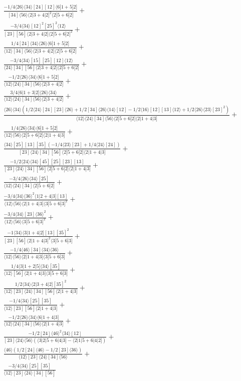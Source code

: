 \documentclass[varwidth, border=5pt]{standalone}
\begin{document}
\begin{my}
$\begin{gathered}
\scriptscriptstyle\frac{-1/4⟨26⟩⟨34⟩[24][12]⟨6|1+5|2]}{[34]⟨56⟩⟨2|3+4|2]^2⟨2|5+6|2]}+\\
\scriptscriptstyle\frac{-3/4⟨34⟩[12]^2[25]^2⟨12⟩}{[23][56]⟨2|3+4|2]⟨2|5+6|2]^2}+\\
\scriptscriptstyle\frac{1/4[24]⟨34⟩⟨26⟩⟨6|1+5|2]}{⟨12⟩[34]⟨56⟩⟨2|3+4|2]⟨2|5+6|2]}+\\
\scriptscriptstyle\frac{-3/4⟨34⟩[15][25][12]⟨12⟩}{⟨24⟩[34][56]⟨2|3+4|2]⟨2|5+6|2]}+\\
\scriptscriptstyle\frac{-1/2⟨26⟩⟨34⟩⟨6|1+5|2]}{⟨12⟩⟨24⟩[34]⟨56⟩⟨2|3+4|2]}+\\
\scriptscriptstyle\frac{3/4⟨6|1+3|2]⟨26⟩⟨34⟩}{⟨12⟩⟨24⟩[34]⟨56⟩⟨2|3+4|2]}+\\
\scriptscriptstyle\frac{⟨26⟩⟨34⟩(1/2⟨24⟩[24][23]⟨26⟩+1/2[34]⟨26⟩⟨14⟩[12]-1/2⟨16⟩[12][13]⟨12⟩+1/2⟨26⟩⟨23⟩[23]^2)}{⟨12⟩⟨24⟩[34]⟨56⟩⟨2|5+6|2]⟨2|1+4|3]}+\\
\scriptscriptstyle\frac{1/4⟨26⟩⟨34⟩⟨6|1+5|2]}{⟨12⟩⟨56⟩⟨2|5+6|2]⟨2|1+4|3]}+\\
\scriptscriptstyle\frac{⟨34⟩[25][13][35](-1/4⟨23⟩[23]+1/4⟨24⟩[24])}{[23]⟨24⟩[34][56]⟨2|5+6|2]⟨2|1+4|3]}+\\
\scriptscriptstyle\frac{-1/2⟨24⟩⟨34⟩[45][25][23][13]}{[23]⟨24⟩[34][56]⟨2|5+6|2]⟨2|1+4|3]}+\\
\scriptscriptstyle\frac{-3/4⟨26⟩⟨34⟩[25]}{⟨12⟩⟨24⟩[34]⟨2|5+6|2]}+\\
\scriptscriptstyle\frac{-3/4⟨34⟩⟨36⟩^2⟨1|2+4|3][13]}{⟨12⟩⟨56⟩⟨2|1+4|3]⟨3|5+6|3]^2}+\\
\scriptscriptstyle\frac{-3/4⟨34⟩[23]⟨36⟩^2}{⟨12⟩⟨56⟩⟨3|5+6|3]^2}+\\
\scriptscriptstyle\frac{-1⟨34⟩⟨3|1+4|2][13][35]^2}{[23][56]⟨2|1+4|3]^2⟨3|5+6|3]}+\\
\scriptscriptstyle\frac{-1/4⟨46⟩[34]⟨34⟩⟨36⟩}{⟨12⟩⟨56⟩⟨2|1+4|3]⟨3|5+6|3]}+\\
\scriptscriptstyle\frac{1/4⟨3|1+2|5]⟨34⟩[35]}{⟨12⟩[56]⟨2|1+4|3]⟨3|5+6|3]}+\\
\scriptscriptstyle\frac{1/2⟨34⟩⟨2|3+4|2][35]^2}{⟨12⟩[23]⟨24⟩[34][56]⟨2|1+4|3]}+\\
\scriptscriptstyle\frac{-1/4⟨34⟩[25][35]}{⟨12⟩[23][56]⟨2|1+4|3]}+\\
\scriptscriptstyle\frac{-1/2⟨26⟩⟨34⟩⟨6|1+4|3]}{⟨12⟩⟨24⟩[34]⟨56⟩⟨2|1+4|3]}+\\
\scriptscriptstyle\frac{-1/2[24]⟨46⟩^2⟨34⟩[12]}{[23]⟨24⟩⟨56⟩(⟨3|2|5+6|4|3]-⟨2|1|5+6|4|2])}+\\
\scriptscriptstyle\frac{⟨46⟩(1/2[24]⟨46⟩-1/2[23]⟨36⟩)}{⟨12⟩[23]⟨24⟩[34]⟨56⟩}+\\
\scriptscriptstyle\frac{-3/4⟨34⟩[25][35]}{⟨12⟩[23]⟨24⟩[34][56]}\phantom{+}
\end{gathered}$
\end{my}
\end{document}
